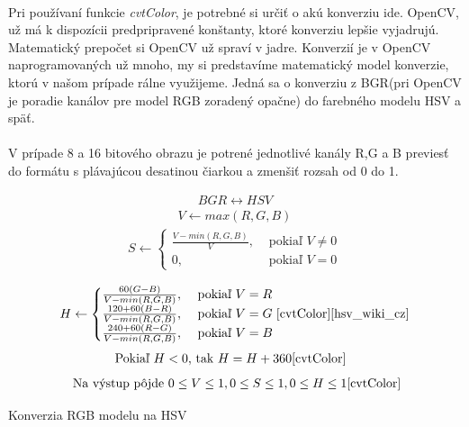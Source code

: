 \documentclass[12pt]{article}
\begin{document}
\paragraph{}
Pri používaní funkcie \emph{cvtColor}, je potrebné si určiť o akú konverziu ide. OpenCV, už má k dispozícii predpripravené konštanty, ktoré konverziu lepšie vyjadrujú.
Matematický prepočet si OpenCV už spraví v jadre. Konverzií je v OpenCV naprogramovaných už mnoho, my si predstavíme matematický model konverzie,
ktorú v našom prípade rálne využijeme. Jedná sa o konverziu z BGR(pri OpenCV je poradie kanálov pre model RGB zoradený opačne) do farebného modelu HSV a späť.
\cite{cvtColor}
\cite{OpenCVDoc}
\paragraph{} 
V prípade 8 a 16 bitového obrazu je potrené jednotlivé kanály R,G a B previesť do formátu s plávajúcou desatinou čiarkou a zmenšiť rozsah od 0 do 1.
\begin{table}
\begin{align*}
BGR \leftrightarrow HSV
\end{align*}
\begin{align*}
V \leftarrow max(R,G,B)
\end{align*}
\begin{align*}
S \leftarrow \begin{cases} \frac{V - min(R,G,B)}{V}, & \text{ pokiaľ } V \neq 0 \\ 0, & \text{ pokiaľ } V = 0 \end{cases} \\
\end{align*}
\begin{align*}
H \leftarrow \begin{cases} \frac{60(G - B)}{V - min(R,G,B)}, & \text{ pokiaľ } V = R \\ \frac{120 + 60(B - R)}{V - min(R,G,B)}, & \text{ pokiaľ } V = G \\ \frac{240 + 60(R - G)}{V - min(R,G,B)}, & \text{ pokiaľ } V = B \end{cases} 
\cite{cvtColor}
\cite{hsv_wiki_cz}
\end{align*}
\begin{align*}
\text{ Pokiaľ } H < 0, & \text{ tak } H = H + 360
\cite{cvtColor}
\end{align*}
\begin{align*}
\text{ Na výstup pôjde } 0 \le V \le 1, 0 \le S \le 1, 0 \le H \le 1
\cite{cvtColor}
\end{align*}
\caption{Konverzia RGB modelu na HSV\cite{hsv_wiki_cz}\cite{cvtColor}\cite{OpenCVDoc}}
\label{cvtColorEquals}
\end{table}
\end{document}

